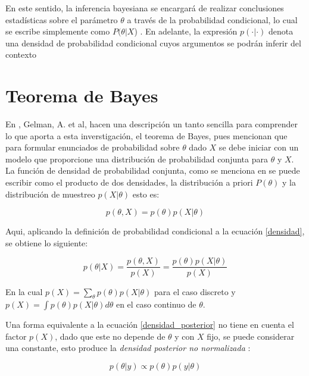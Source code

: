 En este sentido, la inferencia bayesiana se encargará de realizar conclusiones estadísticas sobre el parámetro $\theta$ a través de la probabilidad condicional, lo cual se escribe simplemente como $P(\theta | X$) \cite{infe_bayes}. En adelante, la expresión $p(\cdot|\cdot)$
denota una densidad de probabilidad condicional cuyos argumentos se podrán inferir del contexto  

\section{Teorema de Bayes}

En \cite{infe_bayes}, Gelman, A. et al, hacen una descripción un tanto sencilla para comprender lo que aporta a esta inverstigación, el teorema de Bayes, pues mencionan que para formular enunciados de probabilidad sobre $\theta$ dado $X$ se debe iniciar con un modelo que proporcione una distribución de probabilidad conjunta para $\theta$ y $X$. 
La función de densidad de probabilidad conjunta, como se menciona en \cite{infe_bayes} se puede escribir como el producto de dos densidades, la distribución a priori $P(\theta)$ y la distribución de muestreo $p(X|\theta)$ esto es: 
\begin{center}
\begin{equation}
p(\theta,X)=p(\theta)p(X|\theta)
\label{densidad}
\end{equation}
\end{center}

Aqui, aplicando la definición de probabilidad condicional a la ecuación \ref{densidad}, se obtiene lo siguiente:

\begin{center}
\begin{equation}
p(\theta|X)=\frac{p(\theta,X)}{p(X)}=\frac{p(\theta)p(X|\theta)}{p(X)}
\label{densidad_posterior}
\end{equation}
\end{center}

En la cual $p(X)=\sum_{\theta}p(\theta)p(X|\theta)$ para el caso discreto y $p(X)=\int p(\theta)p(X|\theta)d\theta $ en el caso continuo de $\theta$. 

Una forma equivalente a la ecuación \ref{densidad_posterior} no tiene en cuenta el factor $p(X)$, dado que este no depende de $\theta$ y con $X$ fijo, se puede considerar una constante, esto produce la \textit{densidad posterior no normalizada} \cite{infe_bayes}: 

\begin{equation}
p(\theta|y)\propto p(\theta)p(y|\theta)
\label{densidad_posterior_no_norm}
\end{equation}

